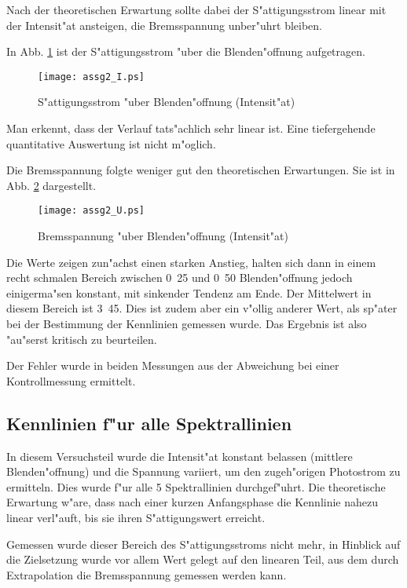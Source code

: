 \documentclass[a4paper,10pt]{article}
\begin{document}
    Nach der theoretischen Erwartung sollte dabei der S"attigungsstrom linear mit der Intensit"at ansteigen, die Bremsspannung unber"uhrt bleiben.

    In Abb. \ref{assg2_I} ist der S"attigungsstrom "uber die Blenden"offnung aufgetragen.
    \begin{figure}[htp]
      \centering
      \texttt{[image: assg2\_I.ps]}
    \caption{S"attigungsstrom "uber Blenden"offnung (Intensit"at)}
    \label{assg2_I}
    \end{figure}
    Man erkennt, dass der Verlauf tats"achlich sehr linear ist. Eine tiefergehende quantitative Auswertung ist nicht m"oglich.

    Die Bremsspannung folgte weniger gut den theoretischen Erwartungen. Sie ist in Abb. \ref{assg2_U} dargestellt.
    \begin{figure}[htp]
      \centering
      \texttt{[image: assg2\_U.ps]}
    \caption{Bremsspannung "uber Blenden"offnung (Intensit"at)}
    \label{assg2_U}
    \end{figure}
    Die Werte zeigen zun"achst einen starken Anstieg, halten sich dann in einem recht schmalen Bereich zwischen \unit{0.25}{\milli\meter} und \unit{0.50}{\milli\meter} Blenden"offnung jedoch einigerma"sen konstant, mit sinkender Tendenz am Ende. Der Mittelwert in diesem Bereich ist \unit{3.45}{\volt}. Dies ist zudem aber ein v"ollig anderer Wert, als sp"ater bei der Bestimmung der Kennlinien gemessen wurde. Das Ergebnis ist also "au"serst kritisch zu beurteilen.

    Der Fehler wurde in beiden Messungen aus der Abweichung bei einer Kontrollmessung ermittelt.

  \subsection{Kennlinien f"ur alle Spektrallinien}
    In diesem Versuchsteil wurde die Intensit"at konstant belassen (mittlere Blenden"offnung) und die Spannung variiert, um den zugeh"origen Photostrom zu ermitteln. Dies wurde f"ur alle 5 Spektrallinien durchgef"uhrt. Die theoretische Erwartung w"are, dass nach einer kurzen Anfangsphase die Kennlinie nahezu linear verl"auft, bis sie ihren S"attigungswert erreicht.

    Gemessen wurde dieser Bereich des S"attigungsstroms nicht mehr, in Hinblick auf die Zielsetzung wurde vor allem Wert gelegt auf den linearen Teil, aus dem durch Extrapolation die Bremsspannung gemessen werden kann.
\end{document}
